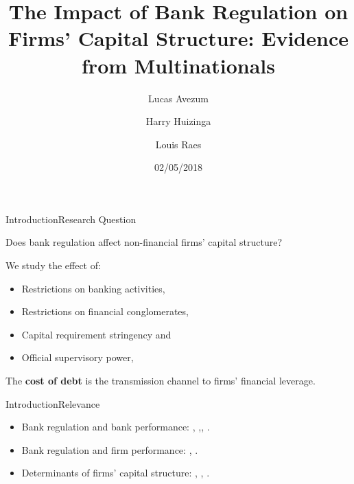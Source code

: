 \documentclass{beamer}
\title{The Impact of Bank Regulation on Firms' Capital Structure: Evidence from Multinationals}
\author{Lucas Avezum \and Harry Huizinga \and Louis Raes}
\date{02/05/2018}
\begin{document}
	\begin{frame}
	\titlepage
\end{frame}

\begin{frame}{Introduction}{Research Question}

Does bank regulation affect non-financial firms' capital structure?\\

\vspace{\baselineskip}

We study the effect of:
\vspace{\baselineskip}
\begin{itemize}
	\item Restrictions on banking activities,
	\item Restrictions on financial conglomerates,
\item	Capital requirement stringency and
	\item Official supervisory power,
		
\end{itemize}
\vspace{\baselineskip}
The \textbf{cost of debt} is the transmission channel to firms' financial leverage. 
\end{frame}


\begin{frame}{Introduction}{Relevance}

\begin{itemize}
	\item Bank regulation and bank performance: \cite{barth2013}, \cite{anginer2014does},\cite{caprio2014macro}, \cite{demirguc2013bank}.
	\vspace{\baselineskip}
	\item Bank regulation and firm performance: \cite{amore2013credit}, \cite{jimenez2017macroprudential}.
	\vspace{\baselineskip}
	\item Determinants of firms' capital structure:
	\cite{leary2009bank}, \cite{rajan1995we}, \cite{oztekin2015capital}.   

\end{itemize}


\end{frame}
\end{document}
